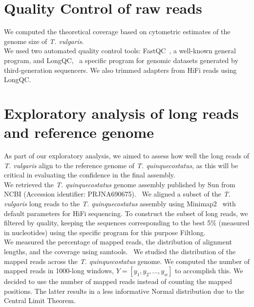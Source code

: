 \section*{Quality Control of raw reads}

We computed the theoretical coverage based on cytometric estimates of the genome size of \textit{T. vulgaris}.~\cite{PlantDNACvalues}\\

We used two automated quality control tools: FastQC~\cite{BabrahamBioinformaticsFastQC}, a well-known general program, and LongQC,~\cite{fukasawaLongQCQualityControl2020} a specific program for genomic datasets generated by third-generation sequencers. We also trimmed adapters from \ac{HiFi} reads using LongQC.~\cite{fukasawaLongQCQualityControl2020} \\

\section*{Exploratory analysis of long reads and reference genome}

As part of our exploratory analysis, we aimed to assess how well the long reads of \textit{T. vulgaris} align to the reference genome of \textit{T. quinquecostatus}, as this will be critical in evaluating the confidence in the final assembly.  \\

We retrieved the \textit{T. quinquecostatus} genome assembly published by Sun \etal from NCBI (Accession identifier: PRJNA690675).~\cite{sunChromosomelevelAssemblyAnalysis2022} We aligned a subset of the \textit{T. vulgaris} long reads to the \textit{T. quinquecostatus} assembly using Minimap2~\cite{liMinimap2PairwiseAlignment2018} with default parameters for \ac{HiFi} sequencing. To construct the subset of long reads, we filtered by quality, keeping the sequences corresponding to the best 5\% (measured in nucleotides) using the specific program for this purpose Filtlong.~\cite{RrwickFiltlongQuality}\\

We measured the percentage of mapped reads, the distribution of alignment lengths, and the coverage using samtools.~\cite{danecekTwelveYearsSAMtools2021} We studied the distribution of the mapped reads across the \textit{T. quinquecostatus} genome. We computed the number of mapped reads in 1000-long windows, $Y = [ y_1, y_2, \dots, y_w]$ to accomplish this. We decided to use the number of mapped reads instead of counting the mapped positions. The latter results in a less informative Normal distribution due to the Central Limit Theorem.~\cite{whitlockAnalysisBiologicalData2015}\\

